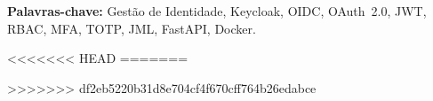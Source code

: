 \documentclass[12pt,a4paper,twoside]{report}
\begin{document}
\textbf{Palavras-chave:} Gestão de Identidade, Keycloak, OIDC, OAuth~2.0, JWT, RBAC, MFA, TOTP, JML, FastAPI, Docker.

\tableofcontents
\listoffigures
\listoftables
{}
\lstlistoflistings
\printglossary[type=\acronymtype, title=Acrónimos, nonumberlist]












\appendix


<<<<<<< HEAD
=======

>>>>>>> df2eb5220b31d8e704cf4f670cff764b26edabce
\end{document}
